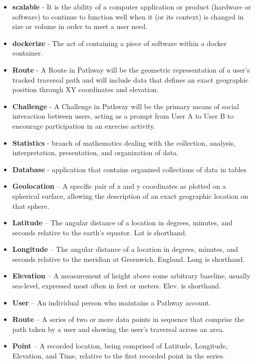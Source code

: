 \documentclass{article}
\begin{document}
\begin{itemize}
    \item \textbf{scalable} - It is the ability of a computer application or product (hardware or software) to continue to function well when it (or its context) is changed in size or volume in order to meet a user need.
    \item \textbf{dockerize} - The act of containing a piece of software within a docker container.
    \item \textbf{Route} - A Route in Pathway will be the geometric representation of a user’s tracked traversal path and will include data that defines an exact geographic position through XY coordinates and elevation.
    \item \textbf{Challenge} - A Challenge in Pathway will be the primary means of social interaction between users, acting as a prompt from User A to User B to encourage participation in an exercise activity.
    \item \textbf{Statistics} - branch of mathematics dealing with the collection, analysis, interpretation, presentation, and organization of data.
    \item \textbf{Database} - application that contains organized collections of data in tables
    \item \textbf{Geolocation} – A specific pair of x and y coordinates as plotted on a spherical surface, allowing the description of an exact geographic location on that sphere.
    \item \textbf{Latitude} – The angular distance of a location in degrees, minutes, and seconds relative to the earth’s equator. Lat is shorthand.
    \item \textbf{Longitude} – The angular distance of a location in degrees, minutes, and seconds relative to the meridian at Greenwich, England. Long is shorthand.
    \item \textbf{Elevation} – A measurement of height above some arbitrary baseline, usually sea-level, expressed most often in feet or meters. Elev. is shorthand.
    \item \textbf{User} – An individual person who maintains a Pathway account.
    \item \textbf{Route} – A series of two or more data points in sequence that comprise the path taken by a user and showing the user’s traversal across an area.
    \item \textbf{Point} – A recorded location, being comprised of Latitude, Longitude, Elevation, and Time, relative to the first recorded point in the series.
\end{itemize}
\end{document}
